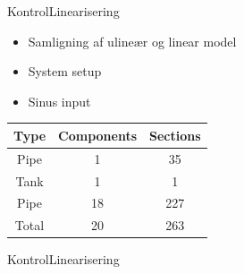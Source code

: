 \begin{frame}{Kontrol}{Linearisering}
   \vfill\vfill\centering
    \begin{minipage}[t]{0.48\linewidth}
\begin{itemize}
		\item Samligning af ulineær og linear model
		\item System setup
	   	\item Sinus input
\end{itemize}    
\end{minipage}\hfill
\begin{minipage}[t]{0.48\linewidth}
\begin{table}[H]
\centering
\begin{tabular}{|c|c|c|}
\hline
	\rowcolor[HTML]{9B9B9B} 
Type  & Components & Sections \\ \hline
Pipe  & 1         & 35       \\ \hline
Tank  & 1         & 1        \\ \hline
Pipe  & 18        & 227      \\ \hline
Total & 20        & 263      \\ \hline
\end{tabular}
\label{tab:system_setup_nonlinear_linear_test}
\end{table}

\end{minipage}
\vfill\vfill

\end{frame}

\begin{frame}{Kontrol}{Linearisering}
\vfill \vfill \centering
% 
\vspace{-5mm}
\begin{figure}
\centering

\label{fig:linear_nonlinear_comparison_tank_height}
\end{figure}

    \vspace{-9mm}
\begin{figure}
\centering

\label{fig:linear_nonlinear_comparison_last_pipe}
\end{figure}
\vspace{5mm}
\vfill \vfill
\end{frame}

